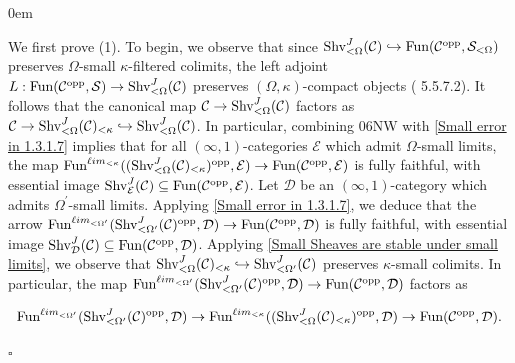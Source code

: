 \documentclass[10pt]{article}
\newcommand{\mS}{\mathcal S}
\newcommand{\C}{\mathcal C}
\newcommand{\cD}{\mathcal{D}}
\newcommand{\cE}{\mathcal{E}}
\renewcommand{\qed}{\hfill$\square$}
\renewenvironment{proof}{\begin{addmargin}[1em]{0em}\begin{newproof}}{\end{newproof}\end{addmargin}\qed}
\theoremstyle{witharg}
\theoremstyle{witharg}
\theoremstyle{witharg2}
\begin{document}
\begin{proof}

    We first prove (1). To begin, we observe that since $\textnormal{Shv}^J_{<\Omega}(\C)\hookrightarrow \textnormal{Fun}(\C^{\textnormal{opp}},\mS_{<\Omega})$ preserves $\Omega$-small $\kappa$-filtered colimits, the left adjoint $L:\textnormal{Fun}(\C^{\textnormal{opp}},\mS)\rightarrow \textnormal{Shv}^J_{<\Omega}(\C)$ preserves $(\Omega,\kappa)$-compact objects ( 5.5.7.2). It follows that the canonical map $\C\rightarrow \textnormal{Shv}^J_{<\Omega}(\C)$ factors as $\C\rightarrow \textnormal{Shv}_{<\Omega}^J(\C)_{<\kappa}\hookrightarrow \textnormal{Shv}_{<\Omega}^J(\C)$. In particular, combining  06NW with \ref{Small error in 1.3.1.7} implies that for all $(\infty,1)$-categories $\cE$ which admit $\Omega$-small limits, the map $\textnormal{Fun}^{\ell im_{<\kappa}}((\textnormal{Shv}_{<\Omega}^J(\C)_{<\kappa})^{\textnormal{opp}},\cE)\rightarrow \textnormal{Fun}(\C^{\textnormal{opp}},\cE)$ is fully faithful, with essential image $\textnormal{Shv}_{\cE}^J(\C)\subseteq \textnormal{Fun}(\C^{\textnormal{opp}},\cE)$. Let $\cD$ be an $(\infty,1)$-category which admits $\Omega^\prime$-small limits. Applying  \ref{Small error in 1.3.1.7}, we deduce that the arrow $\textnormal{Fun}^{\ell im_{<\Omega^\prime}}(\textnormal{Shv}^J_{<\Omega^\prime}(\C)^{\textnormal{opp}},\cD)\rightarrow \textnormal{Fun}(\C^{\textnormal{opp}},\cD)$ is fully faithful, with essential image $\textnormal{Shv}_{\cD}^J(\C)\subseteq \textnormal{Fun}(\C^{\textnormal{opp}},\cD)$. Applying \ref{Small Sheaves are stable under small limits}, we observe that $\textnormal{Shv}_{<\Omega}^J(\C)_{<\kappa}\hookrightarrow \textnormal{Shv}^J_{<\Omega^\prime}(\C)$ preserves $\kappa$-small colimits. In particular, the map $\textnormal{Fun}^{\ell im_{<\Omega^\prime}}(\textnormal{Shv}^J_{<\Omega^\prime}(\C)^{\textnormal{opp}},\cD)\rightarrow \textnormal{Fun}(\C^{\textnormal{opp}},\cD)$ factors as 

    $$\textnormal{Fun}^{\ell im_{<\Omega^\prime}}(\textnormal{Shv}^J_{<\Omega^\prime}(\C)^{\textnormal{opp}},\cD)\rightarrow \textnormal{Fun}^{\ell im_{<\kappa}}((\textnormal{Shv}_{<\Omega}^J(\C)_{<\kappa})^{\textnormal{opp}},\cD)\rightarrow \textnormal{Fun}(\C^{\textnormal{opp}},\cD).$$


\end{proof}
\end{document}
